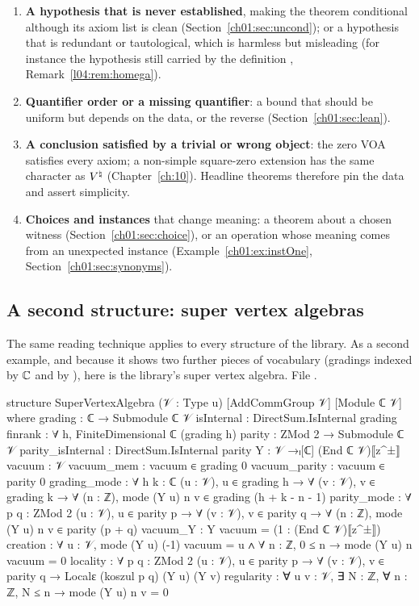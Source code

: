 \begin{enumerate}[label=(F\arabic*)]
  Section~\ref{ch01:sec:junk}.
\item \textbf{A hypothesis that is never established}, making the theorem conditional although its
  axiom list is clean (Section~\ref{ch01:sec:uncond}); or a hypothesis that is redundant or
  tautological, which is harmless but misleading (for instance the hypothesis  still carried by the definition , Remark~\ref{l04:rem:homega}).
\item \textbf{Quantifier order or a missing quantifier}: a bound that should be uniform but depends on
  the data, or the reverse (Section~\ref{ch01:sec:lean}).
\item \textbf{A conclusion satisfied by a trivial or wrong object}: the zero VOA satisfies every
  axiom; a non-simple square-zero extension has the same character as ${V^{\natural}}$
  (Chapter~\ref{ch:10}). Headline theorems therefore pin the data and assert simplicity.
\item \textbf{Choices and instances} that change meaning: a theorem about a chosen witness
  (Section~\ref{ch01:sec:choice}), or an operation whose meaning comes from an unexpected instance
  (Example~\ref{ch01:ex:instOne}, Section~\ref{ch01:sec:synonyms}).
\end{enumerate}

\subsection{A second structure: super vertex algebras}\label{ch01:sec:super}

The same reading technique applies to every structure of the library. As a second example, and
because it shows two further pieces of vocabulary (gradings indexed by ${\mathbb{C}}$ and by ),
here is the library's super vertex algebra.
\noindent File .
\begin{leancode}
structure SuperVertexAlgebra (𝒱 : Type u) [AddCommGroup 𝒱] [Module ℂ 𝒱] where
  grading : ℂ → Submodule ℂ 𝒱
  isInternal : DirectSum.IsInternal grading
  finrank : ∀ h, FiniteDimensional ℂ (grading h)
  parity : ZMod 2 → Submodule ℂ 𝒱
  parity_isInternal : DirectSum.IsInternal parity
  Y : 𝒱 →ₗ[ℂ] (End ℂ 𝒱)⟦z^±⟧
  vacuum : 𝒱
  vacuum_mem : vacuum ∈ grading 0
  vacuum_parity : vacuum ∈ parity 0
  grading_mode : ∀ {h k : ℂ} (u : 𝒱), u ∈ grading h → ∀ (v : 𝒱), v ∈ grading k →
    ∀ (n : ℤ), mode (Y u) n v ∈ grading (h + k - n - 1)
  parity_mode : ∀ {p q : ZMod 2} (u : 𝒱), u ∈ parity p → ∀ (v : 𝒱), v ∈ parity q →
    ∀ (n : ℤ), mode (Y u) n v ∈ parity (p + q)
  vacuum_Y : Y vacuum = (1 : (End ℂ 𝒱)⟦z^±⟧)
  creation : ∀ u : 𝒱, mode (Y u) (-1) vacuum = u ∧ ∀ n : ℤ, 0 ≤ n → mode (Y u) n vacuum = 0
  locality : ∀ {p q : ZMod 2} (u : 𝒱), u ∈ parity p → ∀ (v : 𝒱), v ∈ parity q →
    Localε (koszul p q) (Y u) (Y v)
  regularity : ∀ u v : 𝒱, ∃ N : ℤ, ∀ n : ℤ, N ≤ n → mode (Y u) n v = 0
\end{leancode}

